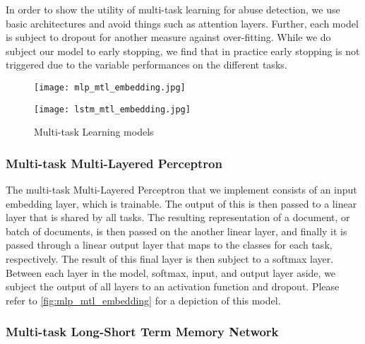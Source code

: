 In order to show the utility of multi-task learning for abuse detection, we use basic architectures and avoid things such as attention layers. Further, each model is subject to dropout for another measure against over-fitting.  While we do subject our model to early stopping, we find that in practice early stopping is not triggered due to the variable performances on the different tasks.

\begin{figure}
  \begin{minipage}{0.5\linewidth}
    \centering
    \texttt{[image: mlp\_mtl\_embedding.jpg]}
    \label{fig:mlp_mtl_embedding}
  \end{minipage}
  \begin{minipage}{0.5\linewidth}
    \centering
    \texttt{[image: lstm\_mtl\_embedding.jpg]}
    \label{fig:lstm_mtl_embedding}
  \end{minipage}
  \caption{Multi-task Learning models}
  \label{fig:mtl_models}
\end{figure}


\subsubsection{Multi-task Multi-Layered Perceptron}

The multi-task Multi-Layered Perceptron that we implement consists of an input embedding layer, which is trainable. The output of this is then passed to a linear layer that is shared by all tasks. The resulting representation of a document, or batch of documents, is then passed on the another linear layer, and finally it is passed through a linear output layer that maps to the classes for each task, respectively. The result of this final layer is then subject to a softmax layer. Between each layer in the model, softmax, input, and output layer aside, we subject the output of all layers to an activation function and dropout. Please refer to \autoref{fig:mlp_mtl_embedding} for a depiction of this model.


\subsubsection{Multi-task Long-Short Term Memory Network}

